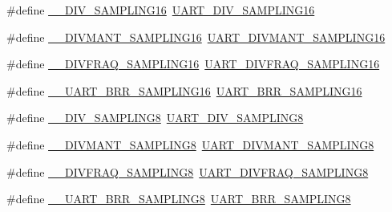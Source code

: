 \begin{DoxyCompactItemize}
\item 
\#define \hyperlink{group___h_a_l___u_a_r_t___aliased___defines_ga95b08a06aee2ed42542ac95224cf13a8}{\+\_\+\+\_\+\+D\+I\+V\+\_\+\+S\+A\+M\+P\+L\+I\+N\+G16}~\hyperlink{group___u_a_r_t___private___macros_gabd6dd99fff6cd5c0374780fd72a61e6e}{U\+A\+R\+T\+\_\+\+D\+I\+V\+\_\+\+S\+A\+M\+P\+L\+I\+N\+G16}
\item 
\#define \hyperlink{group___h_a_l___u_a_r_t___aliased___defines_gaae0a8a1c78ef85c5d4e980f123dce2cb}{\+\_\+\+\_\+\+D\+I\+V\+M\+A\+N\+T\+\_\+\+S\+A\+M\+P\+L\+I\+N\+G16}~\hyperlink{group___u_a_r_t___private___macros_ga9cd479aff25c454d9d4f3c1c20517c86}{U\+A\+R\+T\+\_\+\+D\+I\+V\+M\+A\+N\+T\+\_\+\+S\+A\+M\+P\+L\+I\+N\+G16}
\item 
\#define \hyperlink{group___h_a_l___u_a_r_t___aliased___defines_ga165ca293ce5aa1dc825ce6e69f104f99}{\+\_\+\+\_\+\+D\+I\+V\+F\+R\+A\+Q\+\_\+\+S\+A\+M\+P\+L\+I\+N\+G16}~\hyperlink{group___u_a_r_t___private___macros_gade99ebfd7502df11b366c48fac5417d7}{U\+A\+R\+T\+\_\+\+D\+I\+V\+F\+R\+A\+Q\+\_\+\+S\+A\+M\+P\+L\+I\+N\+G16}
\item 
\#define \hyperlink{group___h_a_l___u_a_r_t___aliased___defines_ga4ef81a279eab794f777deede4ef777cd}{\+\_\+\+\_\+\+U\+A\+R\+T\+\_\+\+B\+R\+R\+\_\+\+S\+A\+M\+P\+L\+I\+N\+G16}~\hyperlink{group___u_a_r_t___private___macros_gaed98b14acfc939985cc9909a6fa64d71}{U\+A\+R\+T\+\_\+\+B\+R\+R\+\_\+\+S\+A\+M\+P\+L\+I\+N\+G16}
\item 
\#define \hyperlink{group___h_a_l___u_a_r_t___aliased___defines_ga5cba2faadc25e5ece57cd3322adf4151}{\+\_\+\+\_\+\+D\+I\+V\+\_\+\+S\+A\+M\+P\+L\+I\+N\+G8}~\hyperlink{group___u_a_r_t___private___macros_ga97075bc06a62c182b0b9a00bbf04b170}{U\+A\+R\+T\+\_\+\+D\+I\+V\+\_\+\+S\+A\+M\+P\+L\+I\+N\+G8}
\item 
\#define \hyperlink{group___h_a_l___u_a_r_t___aliased___defines_ga79e617709be4f56d9a327ca3a7dc316f}{\+\_\+\+\_\+\+D\+I\+V\+M\+A\+N\+T\+\_\+\+S\+A\+M\+P\+L\+I\+N\+G8}~\hyperlink{group___u_a_r_t___private___macros_ga3dafeed17fc4cf319b0dd88d7d0fb614}{U\+A\+R\+T\+\_\+\+D\+I\+V\+M\+A\+N\+T\+\_\+\+S\+A\+M\+P\+L\+I\+N\+G8}
\item 
\#define \hyperlink{group___h_a_l___u_a_r_t___aliased___defines_gac09eaea0db063364f5aac90f47791989}{\+\_\+\+\_\+\+D\+I\+V\+F\+R\+A\+Q\+\_\+\+S\+A\+M\+P\+L\+I\+N\+G8}~\hyperlink{group___u_a_r_t___private___macros_gae0c8a28dbc006a93dd8e90e8ff8a37a0}{U\+A\+R\+T\+\_\+\+D\+I\+V\+F\+R\+A\+Q\+\_\+\+S\+A\+M\+P\+L\+I\+N\+G8}
\item 
\#define \hyperlink{group___h_a_l___u_a_r_t___aliased___defines_ga446f5df9b1c7c4f2bded186402dd4e62}{\+\_\+\+\_\+\+U\+A\+R\+T\+\_\+\+B\+R\+R\+\_\+\+S\+A\+M\+P\+L\+I\+N\+G8}~\hyperlink{group___u_a_r_t___private___macros_gae36ed9e94681494a31a9d8a7bbcc1a2c}{U\+A\+R\+T\+\_\+\+B\+R\+R\+\_\+\+S\+A\+M\+P\+L\+I\+N\+G8}

\end{DoxyCompactItemize}

